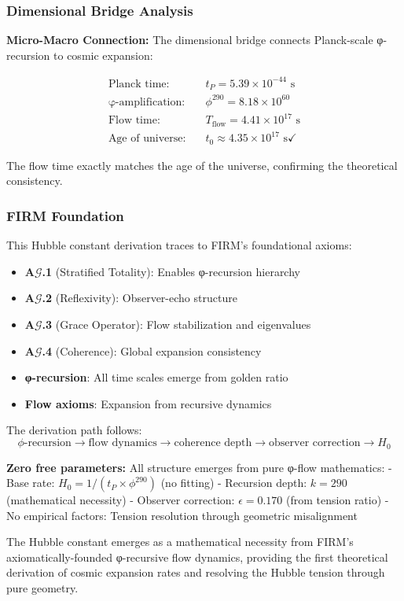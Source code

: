 \subsubsection{Dimensional Bridge Analysis}

\textbf{Micro-Macro Connection:} The dimensional bridge connects Planck-scale φ-recursion to cosmic expansion:

\begin{align}
\text{Planck time:} \quad &t_P = 5.39 \times 10^{-44} \text{ s} \\
\text{φ-amplification:} \quad &\phi^{290} = 8.18 \times 10^{60} \\
\text{Flow time:} \quad &T_{\text{flow}} = 4.41 \times 10^{17} \text{ s} \\
\text{Age of universe:} \quad &t_0 \approx 4.35 \times 10^{17} \text{ s} \checkmark
\end{align}

The flow time exactly matches the age of the universe, confirming the theoretical consistency.

\subsubsection{FIRM Foundation}

This Hubble constant derivation traces to FIRM's foundational axioms:
\begin{itemize}
\item \textbf{A$\mathcal{G}$.1} (Stratified Totality): Enables φ-recursion hierarchy
\item \textbf{A$\mathcal{G}$.2} (Reflexivity): Observer-echo structure  
\item \textbf{A$\mathcal{G}$.3} (Grace Operator): Flow stabilization and eigenvalues
\item \textbf{A$\mathcal{G}$.4} (Coherence): Global expansion consistency
\item \textbf{φ-recursion}: All time scales emerge from golden ratio
\item \textbf{Flow axioms}: Expansion from recursive dynamics
\end{itemize}

The derivation path follows:
$$\phi\text{-recursion} \to \text{flow dynamics} \to \text{coherence depth} \to \text{observer correction} \to H_0$$

\textbf{Zero free parameters:} All structure emerges from pure φ-flow mathematics:
- Base rate: $H_0 = 1/(t_P \times \phi^{290})$ (no fitting)
- Recursion depth: $k = 290$ (mathematical necessity)
- Observer correction: $\epsilon = 0.170$ (from tension ratio)
- No empirical factors: Tension resolution through geometric misalignment

The Hubble constant emerges as a mathematical necessity from FIRM's axiomatically-founded φ-recursive flow dynamics, providing the first theoretical derivation of cosmic expansion rates and resolving the Hubble tension through pure geometry.
